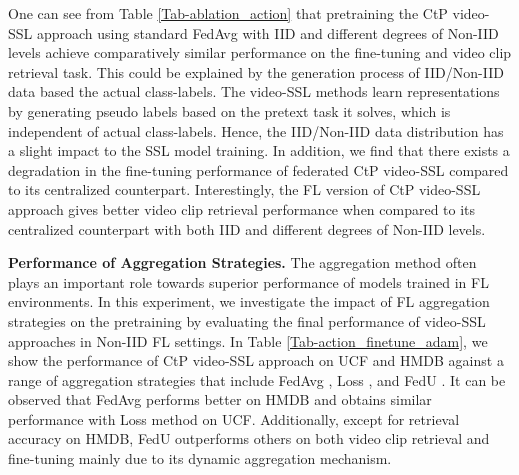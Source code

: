 One can see from Table \ref{Tab-ablation_action} that pretraining the CtP video-SSL approach using standard FedAvg with IID and different degrees of Non-IID levels achieve comparatively similar performance on the fine-tuning and video clip retrieval task.
This could be explained by the generation process of IID/Non-IID data based the actual class-labels. The video-SSL methods learn representations by generating pseudo labels based on the pretext task it solves, which is independent of actual class-labels. Hence, the IID/Non-IID data distribution has a slight impact to the SSL model training.
In addition, we find that there exists a degradation in the fine-tuning performance of federated CtP video-SSL compared to its centralized counterpart. Interestingly, the FL version of CtP video-SSL approach gives better video clip retrieval performance when compared to its centralized counterpart with both IID and different degrees of Non-IID levels.

\noindent \textbf{Performance of Aggregation Strategies.} The aggregation method often plays an important role towards superior performance of models trained in FL environments. 
In this experiment, we investigate the impact of FL aggregation strategies on the pretraining by evaluating the final performance of video-SSL approaches in Non-IID FL settings. In Table \ref{Tab-action_finetune_adam}, we show the performance of CtP video-SSL approach on UCF and HMDB against a range of aggregation strategies that include FedAvg \cite{mcmahan2017communication}, Loss \cite{gao2021end}, and FedU \cite{zhuang2021collaborative}. 
It can be observed that FedAvg performs better on HMDB and obtains similar performance with Loss method on UCF. Additionally, except for retrieval accuracy on HMDB, FedU outperforms others on both video clip retrieval and fine-tuning mainly due to its dynamic aggregation mechanism. 

